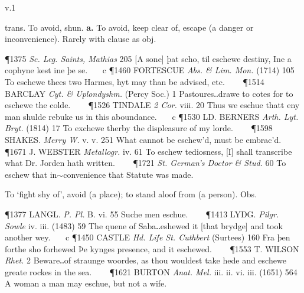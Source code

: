 \begin{description}[wide, labelwidth=!, labelindent=0pt]
 v.1

\noindent {}

\vspace{-0.3cm}

\begin{myenumerate}

 trans. To avoid, shun. \textbf{a.} To avoid, keep clear of, escape (a danger or inconvenience). Rarely with clause as obj.

\P 1375  \textit{Sc. Leg. Saints, Mathias} 205 [A sone] þat scho, til eschewe destiny, Ine a cophyne kest ine þe se.    c 
\P 1460 FORTESCUE  \textit{Abs. \& Lim. Mon.} (1714) 105 To eschewe thees two Harmes, hyt may than be advised, etc.    
\P 1514 BARCLAY  \textit{Cyt. \& Uplondyshm.} (Percy Soc.) 1 Pastoures‥drawe to cotes for to eschewe the colde.    
\P 1526 TINDALE  \textit{2 Cor.} viii. 20 Thus we eschue thatt eny man shulde rebuke us in this aboundance.    c 
\P 1530 LD. BERNERS  \textit{Arth. Lyt. Bryt.} (1814) 17 To exchewe therby the displeasure of my lorde.    
\P 1598 SHAKES.  \textit{Merry W.} v. v. 251 What cannot be eschew'd, must be embrac'd.    
\P 1671 J. WEBSTER  \textit{Metallogr.} iv. 61 To eschew tediosness, [I] shall transcribe what Dr. Jorden hath written.    
\P 1721 \textit{St. German's  Doctor \& Stud.} 60 To eschew that in$\sim$convenience that Statute was made.

 To ‘fight shy of’, avoid (a place); to stand aloof from (a person). Obs.

\P 1377 LANGL.  \textit{P. Pl.} B. vi. 55 Suche men eschue.    
\P 1413 LYDG.  \textit{Pilgr. Sowle} iv. iii. (1483) 59 The quene of Saba‥eshewed it [that brydge] and took another wey.    c 
\P 1450 CASTLE  \textit{Hd. Life St. Cuthbert} (Surtees) 160 Fra þen forthe sho forhewed Þe kynges presence, and it eschewed.    
\P 1553 T. WILSON  \textit{Rhet.} 2 Beware‥of straunge woordes, as thou wouldest take hede and eschewe greate rockes in the sea.    
\P 1621 BURTON  \textit{Anat. Mel.} iii. ii. vi. iii. (1651) 564 A woman a man may eschue, but not a wife.


\end{myenumerate}
\end{description}
